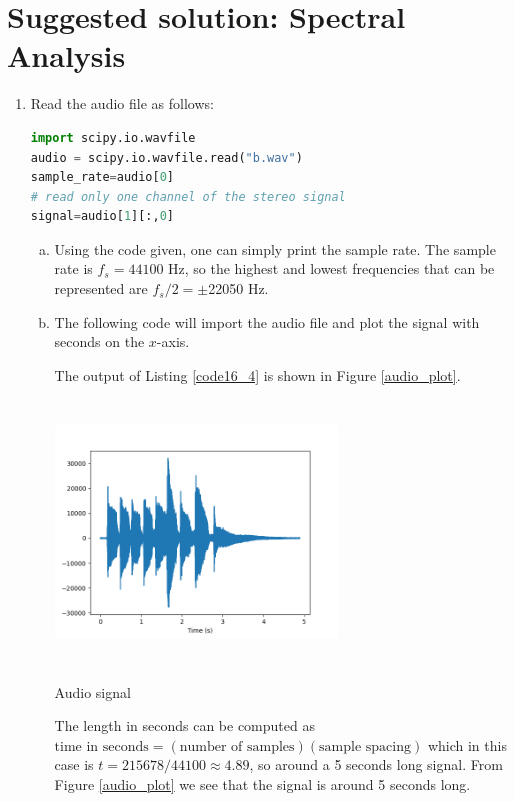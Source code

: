 \newpage
\section{Suggested solution: Spectral Analysis}

\begin{enumerate}
\item Read the audio file as follows:
\begin{lstlisting}[language=Python]
import scipy.io.wavfile
audio = scipy.io.wavfile.read("b.wav")
sample_rate=audio[0]
# read only one channel of the stereo signal
signal=audio[1][:,0]
\end{lstlisting}

\begin{enumerate}[a)]
\item Using the code given, one can simply print the sample rate. The sample rate is $f_s=44100$ Hz, so the highest and lowest frequencies that can be represented are $f_{s}/2=\pm$22050 Hz.

\item The following code will import the audio file and plot the signal with seconds on the $x$-axis. 


The output of Listing \ref{code16_4} is shown in Figure \ref{audio_plot}.
\begin{marginfigure}
    \centering
    \includegraphics[width=7.5cm,height=7.0cm]{ch16/figures/audio.png}
    \caption{Audio signal}
    \label{audio_plot}
\end{marginfigure}
The length in seconds can be computed as $\text{time in seconds}=(\text{number of samples})(\text{sample spacing})$ which in this case is $t=215678/44100\approx 4.89$, so around a 5 seconds long signal. From Figure \ref{audio_plot} we see that the signal is around 5 seconds long. 


\end{enumerate}
\end{enumerate}

